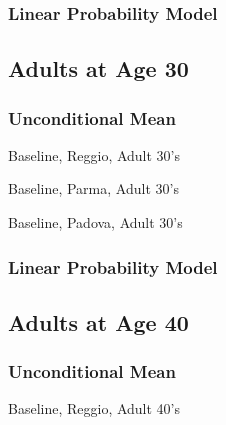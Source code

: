 \documentclass[12pt]{article}
\begin{document}
\subsubsection{Linear Probability Model}






\subsection{Adults at Age 30}
\subsubsection{Unconditional Mean}
\begin{table}[H]
\caption{Baseline, Reggio, Adult 30's}
\scalebox{0.8}{

}
\end{table}

\begin{table}[H]
\caption{Baseline, Parma, Adult 30's}
\scalebox{0.8}{

}
\end{table}

\begin{table}[H]
\caption{Baseline, Padova, Adult 30's}
\scalebox{0.8}{

}
\end{table}


\subsubsection{Linear Probability Model}






\subsection{Adults at Age 40}
\subsubsection{Unconditional Mean}
\begin{table}[H]
\caption{Baseline, Reggio, Adult 40's}
\scalebox{0.8}{

}
\end{table}
\end{document}
